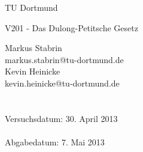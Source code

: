 \documentclass{scrartcl}
\begin{document}
	
	\vspace*{3cm}

	\begin{center}
		\large
		TU Dortmund
	\end{center}

	\begin{center}
		\Huge
		V201 - Das Dulong-Petitsche Gesetz
	\end{center}


	\vspace{6cm} %
	\begin{center}
		\begin{minipage}[b]{8cm}
			\Large
			Markus Stabrin \\
			\normalsize
			markus.stabrin@tu-dortmund.de \\

			\Large
			Kevin Heinicke\\
			\normalsize
			kevin.heinicke@tu-dortmund.de \\
			\\
			\\

			Versuchsdatum: 30. April 2013 \\
			\\
			Abgabedatum: 7. Mai 2013
		\end{minipage}
	\end{center}

	\newpage

	

	

	

	
\end{document}
